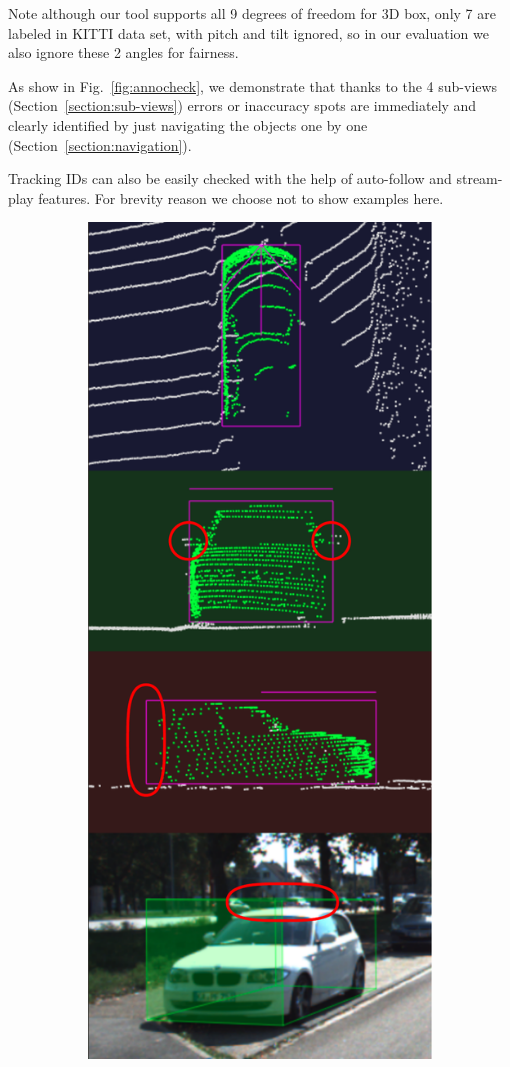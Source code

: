 \documentclass[letterpaper, 10 pt, conference]{ieeeconf}  %
\begin{document}
Note although our tool supports all 9 degrees of freedom for 3D box, only 7 are labeled in KITTI data set, with pitch and tilt ignored, so in our evaluation we also ignore these 2 angles for fairness.

As show in Fig.~\ref{fig:annocheck}, we demonstrate that thanks to the 4 sub-views (Section~\ref{section:sub-views}) errors or inaccuracy spots are immediately and clearly identified by just navigating the objects one by one (Section~\ref{section:navigation}).

Tracking IDs can also be easily checked with the help of auto-follow  and stream-play features. For brevity reason we choose not to show examples here.

\begin{figure}
	\centering
	\begin{subfigure}{0.3\linewidth}
		\includegraphics[scale=0.2]{./figures/annocheck-0}

\end{subfigure}
\end{figure}
\end{document}
